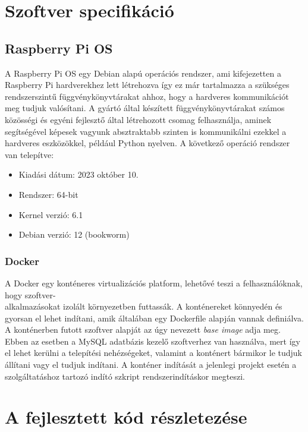 \documentclass[11pt, a4paper]{article}
\begin{document}
	\section{Szoftver specifikáció}
		\subsection{Raspberry Pi OS}
			\begin{flushleft}
				\justifying
				A Raspberry Pi OS egy Debian alapú operációs rendszer, ami kifejezetten a Raspberry Pi hardverekhez lett létrehozva így ez már tartalmazza a szükséges rendszerszintű függvénykönyvtárakat ahhoz, hogy a hardveres kommunikációt meg tudjuk valósítani. A gyártó által készített függvénykönyvtárakat számos közösségi és egyéni fejlesztő által létrehozott csomag felhasználja, aminek segítségével képesek vagyunk absztraktabb szinten is kommunikálni ezekkel a hardveres eszközökkel, például Python nyelven. A következő operáció rendszer van telepítve:
				\begin{itemize}
					\item Kiadási dátum: 2023 október 10.
					\item Rendszer: 64-bit
					\item Kernel verzió: 6.1
					\item Debian verzió: 12 (bookworm)
				\end{itemize}

			\end{flushleft}
		\subsubsection{Docker}
			\begin{flushleft}
				\justifying
				A Docker egy konténeres virtualizációs platform, lehetővé teszi a felhasználóknak, hogy szoftver-\\alkalmazásokat izolált környezetben futtassák. A konténereket könnyedén és gyorsan el lehet indítani, amik általában egy Dockerfile alapján vannak definiálva. A konténerben futott szoftver alapját az úgy nevezett \emph{base image} adja meg. Ebben az esetben a MySQL adatbázis kezelő szoftverhez van használva, mert így el lehet kerülni a telepítési nehézségeket, valamint a konténert bármikor le tudjuk állítani vagy el tudjuk indítani. A konténer indítását a jelenlegi projekt esetén a szolgáltatáshoz tartozó indító szkript rendszerindításkor megteszi.
			\end{flushleft}

	\section{A fejlesztett kód részletezése}
\end{document}
